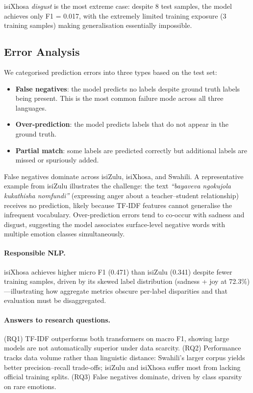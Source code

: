 \documentclass[11pt]{article}
\begin{document}
\noindent
isiXhosa \textit{disgust} is the most extreme case: despite 8 test samples,
the model achieves only F1 = 0.017, with the extremely limited training
exposure (3 training samples) making generalisation essentially impossible.

\subsection{Error Analysis}

We categorised prediction errors into three types based on the test set:

\begin{itemize}[noitemsep]
  \item \textbf{False negatives}: the model predicts no labels despite ground
        truth labels being present. This is the most common failure mode across
        all three languages.
  \item \textbf{Over-prediction}: the model predicts labels that do not appear
        in the ground truth.
  \item \textbf{Partial match}: some labels are predicted correctly but
        additional labels are missed or spuriously added.
\end{itemize}

False negatives dominate across isiZulu, isiXhosa, and Swahili.
A representative example from isiZulu illustrates the challenge:
the text \textit{``bayaveva ngokujola kukathisha nomfundi''} (expressing anger
about a teacher--student relationship) receives no prediction, likely because
TF-IDF features cannot generalise the infrequent vocabulary.
Over-prediction errors tend to co-occur with sadness and disgust, suggesting
the model associates surface-level negative words with multiple emotion classes
simultaneously.

\paragraph{Responsible NLP.}
isiXhosa achieves higher micro F1 (0.471) than isiZulu (0.341) despite fewer
training samples, driven by its skewed label distribution (sadness + joy at
72.3\%)---illustrating how aggregate metrics obscure per-label disparities
and that evaluation must be disaggregated.

\paragraph{Answers to research questions.}
(RQ1) TF-IDF outperforms both transformers on macro F1, showing large models
are not automatically superior under data scarcity.
(RQ2) Performance tracks data volume rather than linguistic distance:
Swahili's larger corpus yields better precision--recall trade-offs;
isiZulu and isiXhosa suffer most from lacking official training splits.
(RQ3) False negatives dominate, driven by class sparsity on rare emotions.
\end{document}
